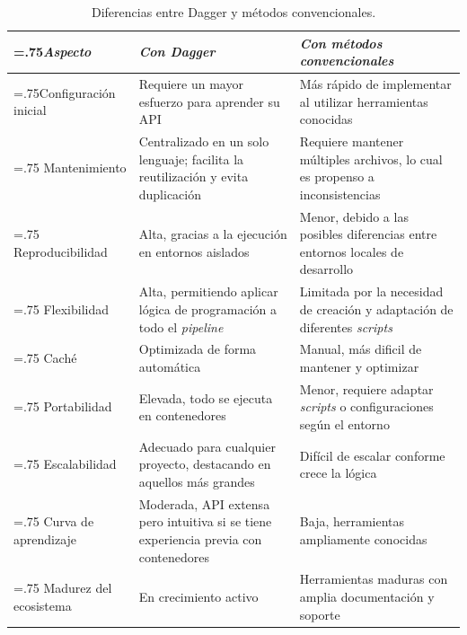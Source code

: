 \begin{table}[htbp]
  \begin{tabularx}{\textwidth}{|>{\hsize=.75\hsize}X|X|>{\hsize=1.25\hsize}X|}
    \hline
    \textit{Aspecto} & \textit{Con Dagger} & \textit{Con métodos convencionales} \\ \hline
    Configuración inicial & Requiere un mayor esfuerzo para aprender su API & Más rápido de implementar al utilizar herramientas conocidas \\ \hline
    Mantenimiento & Centralizado en un solo lenguaje; facilita la reutilización y evita duplicación & Requiere mantener múltiples archivos, lo cual es propenso a inconsistencias \\ \hline
    Reproducibilidad & Alta, gracias a la ejecución en entornos aislados & Menor, debido a las posibles diferencias entre entornos locales de desarrollo \\ \hline
    Flexibilidad & Alta, permitiendo aplicar lógica de programación a todo el \textit{pipeline} & Limitada por la necesidad de creación y adaptación de diferentes \textit{scripts} \\ \hline
    Caché & Optimizada de forma automática & Manual, más dificil de mantener y optimizar \\ \hline
    Portabilidad & Elevada, todo se ejecuta en contenedores & Menor, requiere adaptar \textit{scripts} o configuraciones según el entorno \\ \hline
    Escalabilidad & Adecuado para cualquier proyecto, destacando en aquellos más grandes & Difícil de escalar conforme crece la lógica \\ \hline
    Curva de aprendizaje & Moderada, API extensa pero intuitiva si se tiene experiencia previa con contenedores & Baja, herramientas ampliamente conocidas \\ \hline
    Madurez del ecosistema & En crecimiento activo & Herramientas maduras con amplia documentación y soporte \\ \hline
  \end{tabularx}
  \caption{Diferencias entre Dagger y métodos convencionales.}
  \label{table:differences}
\end{table}
